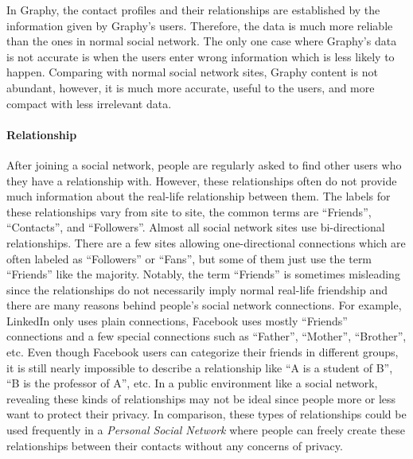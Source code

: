 In Graphy, the contact profiles and their relationships are established by the information given by Graphy's users. Therefore, the data is much more reliable than the ones in normal social network. The only one case where Graphy's data is not accurate is when the users enter wrong information which is less likely to happen. Comparing with normal social network sites, Graphy content is not abundant, however, it is much more accurate, useful to the users, and more compact with less irrelevant data.

\paragraph{Relationship}
After joining a social network, people are regularly asked to find other users who they have a relationship with. However, these relationships often do not provide much information about the real-life relationship between them. The labels for these relationships vary from site to site, the common terms are ``Friends'', ``Contacts'', and ``Followers''. Almost all social network sites use bi-directional relationships. There are a few sites allowing one-directional connections which are often labeled as ``Followers'' or ``Fans'', but some of them just use the term ``Friends'' like the majority. Notably, the term ``Friends'' is sometimes misleading since the relationships do not necessarily imply normal real-life friendship and there are many reasons behind people's social network connections. For example, LinkedIn only uses plain connections, Facebook uses mostly ``Friends'' connections and a few special connections such as ``Father'', ``Mother'', ``Brother'', etc. Even though Facebook users can categorize their friends in different groups, it is still nearly impossible to describe a relationship like ``A is a student of B'', ``B is the professor of A'', etc. In a public environment like a social network, revealing these kinds of relationships may not be ideal since people more or less want to protect their privacy. In comparison, these types of relationships could be used frequently in a \textit{Personal Social Network} where people can freely create these relationships between their contacts without any concerns of privacy.

